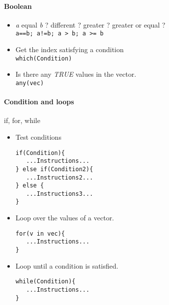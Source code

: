 \documentclass[a4paper,11pt]{article}
\begin{document}
\paragraph{Boolean} 
\begin{itemize} 
  \item {\it a} equal {\it b} ? different ? greater ? greater or equal ? \\ 
    \verb?a==b; a!=b; a > b; a >= b?
  \item Get the index satisfying a condition \\ 
    \verb?which(Condition)?
  \item Is there any {\it TRUE} values in the vector. \\ 
    \verb?any(vec)?
\end{itemize}


\paragraph{Condition and loops} if, for, while
\begin{itemize} 
  \item Test conditions
\begin{verbatim}
if(Condition){
   ...Instructions...
} else if(Condition2){
   ...Instructions2...
} else {
   ...Instructions3...
}
\end{verbatim}
  \item Loop over the values of a vector.
\begin{verbatim}
for(v in vec){
   ...Instructions...
} 
\end{verbatim}
  \item Loop until a condition is satisfied.
\begin{verbatim}
while(Condition){
   ...Instructions...
}
\end{verbatim}
\end{itemize}


\end{document}

